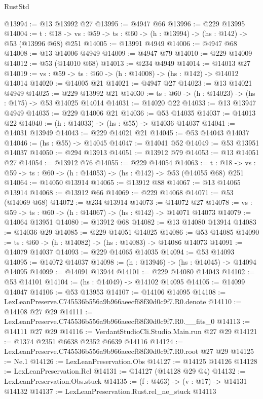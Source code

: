 \begin{lexlean}{RustStd}
\begin{coremodule}
@13994 := @13 @13992 @27
@13995 := @4947 @66
@13996 := @229 @13995
@14004 := {t : @18} ->
  {vs : @59} -> {ts : @60} -> (h : @13994) -> (hs : @142) -> @53 (@13996 @68) @251
@14005 := @13991 @4949
@14006 := @4947 @68
@14008 := @13 @14006 @4949
@14009 := @4947 @79
@14010 := @229 @14009
@14012 := @53 (@14010 @68)
@14013 := @234 @4949
@14014 := @14013 @27
@14019 := {vs : @59} -> {ts : @60} -> (h : @14008) -> (hs : @142) -> @14012 @14014
@14020 := @14005 @21
@14021 := @4947 @27
@14023 := @13 @14021 @4949
@14025 := @229 @13992 @21
@14030 := {ts : @60} -> (h : @14023) -> (hs : @175) -> @53 @14025 @14014
@14031 := @14020 @22
@14033 := @13 @13947 @4949
@14035 := @229 @14006 @21
@14036 := @53 @14035
@14037 := @14013 @22
@14040 := (h : @14033) -> (hs : @55) -> @14036 @14037
@14041 := @14031 @13949
@14043 := @229 @14021 @21
@14045 := @53 @14043 @14037
@14046 := (hs : @55) -> @14045
@14047 := @14041 @52
@14049 := @53 @13951 @14037
@14050 := @294 @13913
@14051 := @13912 @79
@14053 := @13 @14051 @27
@14054 := @13912 @76
@14055 := @229 @14054
@14063 := {t : @18} ->
  {vs : @59} -> {ts : @60} -> (h : @14053) -> (hs : @142) -> @53 (@14055 @68) @251
@14064 := @14050 @13914
@14065 := @13912 @88
@14067 := @13 @14065 @13914
@14068 := @13912 @66
@14069 := @229 @14068
@14071 := @53 (@14069 @68)
@14072 := @234 @13914
@14073 := @14072 @27
@14078 := {vs : @59} -> {ts : @60} -> (h : @14067) -> (hs : @142) -> @14071 @14073
@14079 := @14064 @13951
@14080 := @13912 @68
@14082 := @13 @14080 @13914
@14083 := @14036 @29
@14085 := @229 @14051 @14025
@14086 := @53 @14085
@14090 := {ts : @60} -> (h : @14082) -> (hs : @14083) -> @14086 @14073
@14091 := @14079 @14037
@14093 := @229 @14065 @14035
@14094 := @53 @14093
@14095 := @14072 @14037
@14098 := (h : @13946) -> (hs : @14045) -> @14094 @14095
@14099 := @14091 @13944
@14101 := @229 @14080 @14043
@14102 := @53 @14101
@14104 := (hs : @14049) -> @14102 @14095
@14105 := @14099 @14047
@14106 := @53 @13953
@14107 := @14106 @14095
@14108 := LexLeanPreserve.C745536b556a9b966aeecf68f30d0c9f7.R0.denote
@14110 := @14108 @27 @29
@14111 := LexLeanPreserve.C745536b556a9b966aeecf68f30d0c9f7.R0.__fits_0
@14113 := @14111 @27 @29
@14116 := VerdantStudioCli.Studio.Main.run @27 @29
@14121 := @1374 @2351 @6638 @2352 @6639 @14116
@14124 := LexLeanPreserve.C745536b556a9b966aeecf68f30d0c9f7.R0.root @27 @29
@14125 := Ne.{1}
@14126 := LexLeanPreservation.Obs
@14127 := @14125 @14126
@14128 := LexLeanPreservation.Rel
@14131 := @14127 (@14128 @29 @4)
@14132 := LexLeanPreservation.Obs.stuck
@14135 := (f : @463) -> (v : @17) -> @14131 @14132
@14137 := LexLeanPreservation.Rust.rel_ne_stuck @14113

\end{coremodule}
\end{lexlean}
